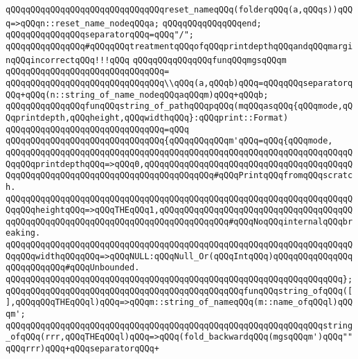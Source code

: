 \verb|qQQqqQQqqQQqqQQqqQQqqQQqqQQqqQQqreset_nameqQQq(folderqQQq(a,qQQqs))qQQq=>qQQqn::reset_name_nodeqQQqa;|\newline
\verb|qQQqqQQqqQQqqQQqend;|\newline
\newline
\verb|qQQqqQQqqQQqqQQqseparatorqQQq=qQQq"/";|\newline
\newline
\verb|qQQqqQQqqQQqqQQq#qQQqqQQqtreatmentqQQqofqQQqprintdepthqQQqandqQQqmarginqQQqincorrectqQQq!!!qQQq|\newline
\verb|qQQqqQQqqQQqqQQqfunqQQqmgsqQQqm|\newline
\verb|qQQqqQQqqQQqqQQqqQQqqQQqqQQqqQQq=|\newline
\verb|qQQqqQQqqQQqqQQqqQQqqQQqqQQqqQQq\\qQQq(a,qQQqb)qQQq=qQQqqQQqseparatorqQQq+qQQq(n::string_of_name_nodeqQQqaqQQqm)qQQq+qQQqb;|\newline
\newline
\verb|qQQqqQQqqQQqqQQqfunqQQqstring_of_pathqQQqpqQQq(mqQQqasqQQq{qQQqmode,qQQqprintdepth,qQQqheight,qQQqwidthqQQq}:qQQqprint::Format)|\newline
\verb|qQQqqQQqqQQqqQQqqQQqqQQqqQQqqQQq=qQQq|\newline
\verb|qQQqqQQqqQQqqQQqqQQqqQQqqQQqqQQq{qQQqqQQqqQQqm'qQQq=qQQq{qQQqmode,|\newline
\verb|qQQqqQQqqQQqqQQqqQQqqQQqqQQqqQQqqQQqqQQqqQQqqQQqqQQqqQQqqQQqqQQqqQQqqQQqqQQqprintdepthqQQq=>qQQq0,qQQqqQQqqQQqqQQqqQQqqQQqqQQqqQQqqQQqqQQqqQQqqQQqqQQqqQQqqQQqqQQqqQQqqQQqqQQqqQQqqQQq#qQQqPrintqQQqfromqQQqscratch.|\newline
\verb|qQQqqQQqqQQqqQQqqQQqqQQqqQQqqQQqqQQqqQQqqQQqqQQqqQQqqQQqqQQqqQQqqQQqqQQqqQQqheightqQQq=>qQQqTHEqQQq1,qQQqqQQqqQQqqQQqqQQqqQQqqQQqqQQqqQQqqQQqqQQqqQQqqQQqqQQqqQQqqQQqqQQqqQQqqQQqqQQqqQQq#qQQqNoqQQqinternalqQQqbreaking.|\newline
\verb|qQQqqQQqqQQqqQQqqQQqqQQqqQQqqQQqqQQqqQQqqQQqqQQqqQQqqQQqqQQqqQQqqQQqqQQqqQQqwidthqQQqqQQq=>qQQqNULL:qQQqNull_Or(qQQqIntqQQq)qQQqqQQqqQQqqQQqqQQqqQQqqQQq#qQQqUnbounded.|\newline
\verb|qQQqqQQqqQQqqQQqqQQqqQQqqQQqqQQqqQQqqQQqqQQqqQQqqQQqqQQqqQQqqQQqqQQq};|\newline
\newline
\verb|qQQqqQQqqQQqqQQqqQQqqQQqqQQqqQQqqQQqqQQqqQQqqQQqfunqQQqstring_ofqQQq([],qQQqqQQqTHEqQQql)qQQq=>qQQqm::string_of_nameqQQq(m::name_ofqQQql)qQQqm';|\newline
\verb|qQQqqQQqqQQqqQQqqQQqqQQqqQQqqQQqqQQqqQQqqQQqqQQqqQQqqQQqqQQqqQQqstring_ofqQQq(rrr,qQQqTHEqQQql)qQQq=>qQQq(fold_backwardqQQq(mgsqQQqm')qQQq""qQQqrrr)qQQq+qQQqseparatorqQQq+|\newline
